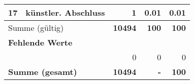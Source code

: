 \begin{longtable}{lXrrr}
     17 &
     \multicolumn{1}{X}{ künstler. Abschluss   } &


       \num{1} &
       \num[round-mode=places,round-precision=2]{0.01} &
         \num[round-mode=places,round-precision=2]{0.01} \\
     \midrule
     \multicolumn{2}{l}{Summe (gültig)} &
       \textbf{\num{10494}} &
     \textbf{\num{100}} &
       \textbf{\num[round-mode=places,round-precision=2]{100}} \\
     \multicolumn{5}{l}{\textbf{Fehlende Werte}}\\
      & & 0 & 0 & 0 \\
     \midrule
     \multicolumn{2}{l}{\textbf{Summe (gesamt)}} &
          \textbf{\num{10494}} &
        \textbf{-} &
        \textbf{\num{100}} \\
     \bottomrule
     \end{longtable}
     
